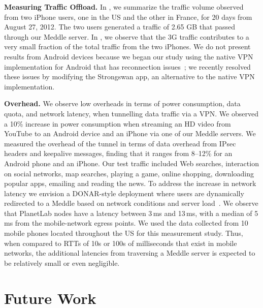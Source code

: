 \documentclass{sig-alternate}
\newcommand{\meddle}{{Meddle}\xspace}
\renewcommand{\fref}{\Fref}
\begin{document}
\textbf{Measuring Traffic Offload.} In \fref{tab:Usage}, we summarize
the traffic volume observed from two iPhone users, one in the US and
the other in France, for 20 days from August 27, 2012. The two users
generated a traffic of 2.65 GB that passed through our \meddle
server. In \fref{tab:Usage}, we observe that the 3G traffic contributes
to a very small fraction of the total traffic from the
two iPhones. We do not present results from Android devices because we
began our study using the native VPN implementation for Android that has
reconnection issues~\cite{OnDemandAndroid}; we recently resolved these
issues by modifying the Strongswan app, an alternative to the native
VPN implementation.  

\textbf{Overhead.} We observe low overheads in terms of power
consumption, data quota, and network latency, when tunnelling data
traffic via a VPN. We observed a 10\% increase in power consumption
when streaming an HD video from YouTube to an Android device and an
iPhone via one of our \meddle servers. We measured the overhead of the
tunnel in terms of data overhead from IPsec headers and keepalive
messages, finding that it ranges from 8--12\% for an Android phone and
an iPhone. Our test traffic included Web searches, interaction on
social networks, map searches, playing a game, online shopping,
downloading popular apps, emailing and reading the news. To address
the increase in network latency we envision a DONAR-style deployment
where users are dynamically redirected to a \meddle based on network
conditions and server load~\cite{wendell:donar}. We observe that
PlanetLab nodes have a latency between 3\,ms and 13\,ms, with a median
of 5\,ms from the mobile-network egress points. We used the data
collected from 10 mobile phones located throughout the US for this
measurement study. Thus, when compared to RTTs of 10s or 100s of
milliseconds that exist in mobile networks, the additional latencies
from traversing a \meddle server is expected to be relatively small or
even negligible.  

\section{Future Work}

\end{document}
